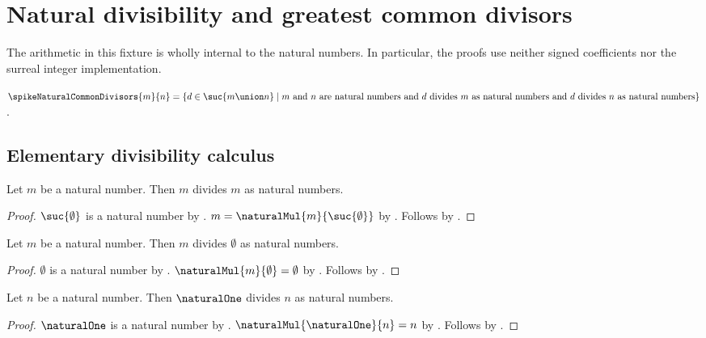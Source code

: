 


\section{Natural divisibility and greatest common divisors}

The arithmetic in this fixture is wholly internal to the natural numbers.
In particular, the proofs use neither signed coefficients nor the surreal
integer implementation.

\begin{definition}\label{spike15_common_divisors}
    $\spikeNaturalCommonDivisors{m}{n}=
        \{d\in\suc{m\union n}\mid
            \text{$m$ and $n$ are natural numbers and
                $d$ divides $m$ as natural numbers and
                $d$ divides $n$ as natural numbers}\}$.
\end{definition}

\subsection{Elementary divisibility calculus}

\begin{proposition}\label{spike15_natural_divides_itself}
    Let $m$ be a natural number.
    Then $m$ divides $m$ as natural numbers.
\end{proposition}
\begin{proof}
    $\suc{\emptyset}$ is a natural number
        by .
    $m=\naturalMul{m}{\suc{\emptyset}}$
        by .
    Follows by .
\end{proof}

\begin{proposition}\label{spike15_every_natural_divides_zero}
    Let $m$ be a natural number.
    Then $m$ divides $\emptyset$ as natural numbers.
\end{proposition}
\begin{proof}
    $\emptyset$ is a natural number by .
    $\naturalMul{m}{\emptyset}=\emptyset$
        by .
    Follows by .
\end{proof}

\begin{proposition}\label{spike15_one_divides_every_natural}
    Let $n$ be a natural number.
    Then $\naturalOne$ divides $n$ as natural numbers.
\end{proposition}
\begin{proof}
    $\naturalOne$ is a natural number
        by .
    $\naturalMul{\naturalOne}{n}=n$
        by .
    Follows by .
\end{proof}

